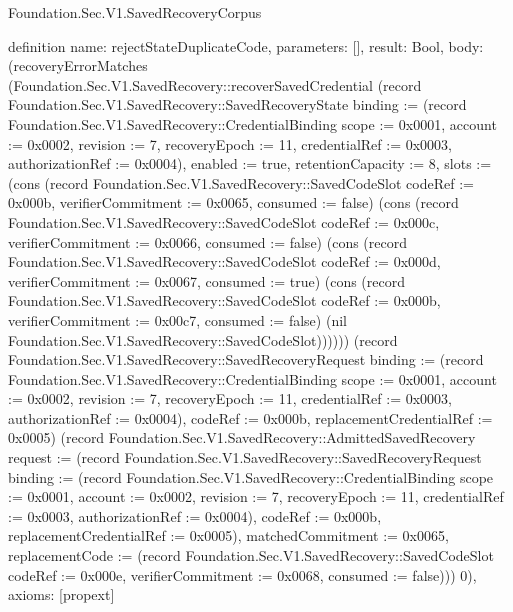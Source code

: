 \begin{lexlean}{Foundation.Sec.V1.SavedRecoveryCorpus}
\begin{semanticmodule}
definition{
  name: rejectStateDuplicateCode,
  parameters: [],
  result: Bool,
  body: (recoveryErrorMatches (Foundation.Sec.V1.SavedRecovery::recoverSavedCredential (record Foundation.Sec.V1.SavedRecovery::SavedRecoveryState {binding := (record Foundation.Sec.V1.SavedRecovery::CredentialBinding {scope := 0x0001, account := 0x0002, revision := 7, recoveryEpoch := 11, credentialRef := 0x0003, authorizationRef := 0x0004}), enabled := true, retentionCapacity := 8, slots := (cons (record Foundation.Sec.V1.SavedRecovery::SavedCodeSlot {codeRef := 0x000b, verifierCommitment := 0x0065, consumed := false}) (cons (record Foundation.Sec.V1.SavedRecovery::SavedCodeSlot {codeRef := 0x000c, verifierCommitment := 0x0066, consumed := false}) (cons (record Foundation.Sec.V1.SavedRecovery::SavedCodeSlot {codeRef := 0x000d, verifierCommitment := 0x0067, consumed := true}) (cons (record Foundation.Sec.V1.SavedRecovery::SavedCodeSlot {codeRef := 0x000b, verifierCommitment := 0x00c7, consumed := false}) (nil Foundation.Sec.V1.SavedRecovery::SavedCodeSlot)))))}) (record Foundation.Sec.V1.SavedRecovery::SavedRecoveryRequest {binding := (record Foundation.Sec.V1.SavedRecovery::CredentialBinding {scope := 0x0001, account := 0x0002, revision := 7, recoveryEpoch := 11, credentialRef := 0x0003, authorizationRef := 0x0004}), codeRef := 0x000b, replacementCredentialRef := 0x0005}) (record Foundation.Sec.V1.SavedRecovery::AdmittedSavedRecovery {request := (record Foundation.Sec.V1.SavedRecovery::SavedRecoveryRequest {binding := (record Foundation.Sec.V1.SavedRecovery::CredentialBinding {scope := 0x0001, account := 0x0002, revision := 7, recoveryEpoch := 11, credentialRef := 0x0003, authorizationRef := 0x0004}), codeRef := 0x000b, replacementCredentialRef := 0x0005}), matchedCommitment := 0x0065, replacementCode := (record Foundation.Sec.V1.SavedRecovery::SavedCodeSlot {codeRef := 0x000e, verifierCommitment := 0x0068, consumed := false})})) 0),
  axioms: [propext]
}


\end{semanticmodule}
\end{lexlean}
